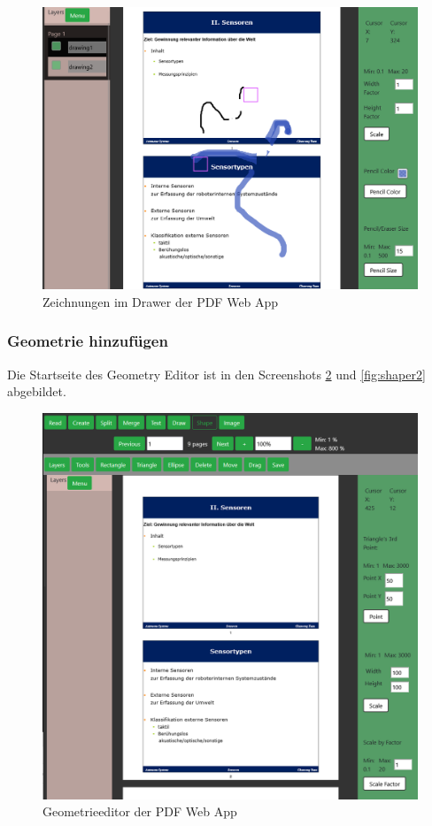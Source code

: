 \begin{figure}[!htbp]
	\centering
	\includegraphics[width=1\textwidth]{"images/drawing.png"}
	\caption{Zeichnungen im Drawer der PDF Web App}
	\label{fig:drawing}
\end{figure}


\subsubsection{Geometrie hinzufügen}
Die Startseite des Geometry Editor ist in den Screenshots \ref{fig:shaper} und \ref{fig:shaper2} abgebildet. 

\begin{figure}[!htbp]
	\centering
	\includegraphics[width=1\textwidth]{"images/shaper.png"}
	\caption{Geometrieeditor der PDF Web App}
	\label{fig:shaper}
\end{figure}

